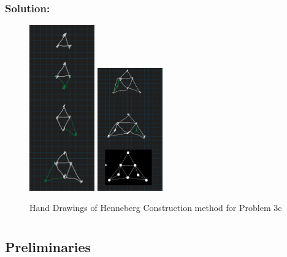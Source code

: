 \documentclass[]{article}
\numberwithin{equation}{section}
\begin{document}
\subsubsection*{Solution:}

\begin{figure}[h]
    \centering
    \includegraphics[width=0.25\textwidth]{figs/pblm3c_1.png}
    \includegraphics[width=0.25\textwidth]{figs/pblm3c_2.png}
    \caption{Hand Drawings of Henneberg Construction method for Problem 3c}
\end{figure}


\newpage
\section{}
\subsection*{Preliminaries}
\end{document}
